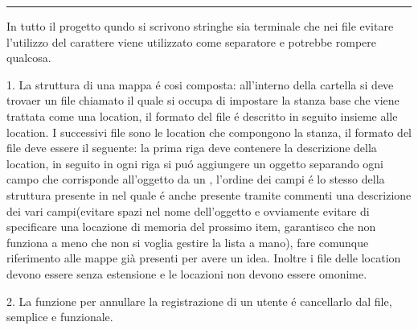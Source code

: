 \documentclass[12pt]{article}
\begin{document}
\par\noindent\rule{\textwidth}{0.1pt}
{
\footnotesize
In tutto il progetto qundo si scrivono stringhe sia terminale che nei file evitare l'utilizzo del carattere  viene utilizzato come separatore e potrebbe rompere qualcosa.

1. La struttura di una mappa é cosi composta: all'interno della cartella si deve trovaer un file chiamato  il quale si occupa di impostare la stanza base che viene trattata come una location, il formato del file é descritto in seguito insieme alle location. I successivi file sono le location che compongono la stanza, il formato del file deve essere il seguente: la prima riga deve contenere la descrizione della location, in seguito in ogni riga si puó aggiungere un oggetto separando ogni campo che corrisponde all'oggetto da un , l'ordine dei campi é lo stesso della struttura presente in  nel quale é anche presente tramite commenti una descrizione dei vari campi(evitare spazi nel nome dell'oggetto e ovviamente evitare di specificare una locazione di memoria del prossimo item, garantisco che non funziona a meno che non si voglia gestire la lista a mano), fare comunque riferimento alle mappe già presenti per avere un idea. Inoltre i file delle location devono essere senza estensione e le locazioni non devono essere omonime.

2. La funzione per annullare la registrazione di un utente é cancellarlo dal file, semplice e funzionale.
}
\end{document}
